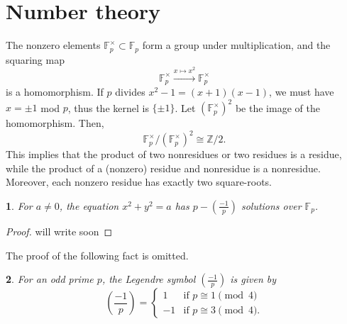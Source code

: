 \documentclass[10pt,a5paper]{amsart}
\numberwithin{equation}{section}
\numberwithin{figure}{section}
\theoremstyle{definition}
\theoremstyle{remark}
\theoremstyle{plain}
\theoremstyle{plain}
\theoremstyle{definition}
\theoremstyle{plain}
\newtheorem{prop}{\protect\propositionname}[section]
\theoremstyle{plain}
\providecommand{\propositionname}{Proposition}
\newcommand{\legendre}[2]{\genfrac{(}{)}{}{}{#1}{#2}}
\begin{document}
\section{Number theory}
The nonzero elements $\mathbb{F}^\times_p \subset \mathbb{F}_p$ form a group under multiplication, and the squaring map
\[
	\mathbb{F}^\times_p \xrightarrow{x \mapsto x^2} \mathbb{F}^\times_p
\]
is a homomorphism. If $p$ divides $x^2 - 1 = (x+1)(x-1)$, we must have $x = \pm 1$ mod $p$, thus the kernel is $\{\pm 1\}$. Let $(\mathbb{F}^\times_p)^2$ be the image of the homomorphism. Then,
\[
	\mathbb{F}^\times_p / (\mathbb{F}^\times_p)^2 \cong \mathbb{Z}/2.
\]
This implies that the product of two nonresidues or two residues is a residue, while the product of a (nonzero) residue and nonresidue is a nonresidue. Moreover, each nonzero residue has exactly two square-roots.
\begin{prop}\label{prop:circle-solutions}
	For $a \neq 0$, the equation $x^2 + y^2 = a$ has $p - \legendre{-1}{p}$ solutions over $\mathbb{F}_p$.
\end{prop}
\begin{proof}
	\color{blue}will write soon\color{black}
\end{proof}
The proof of the following fact is omitted.
\begin{prop}
	For an odd prime $p$, the Legendre symbol $\legendre{-1}{p}$ is given by
	\[
		\legendre{-1}{p} = \left\{
			\begin{matrix}
				1 & \text{if } p \cong 1 \pmod 4 \\
				-1 & \text{if } p \cong 3 \pmod 4.
			\end{matrix}
		\right.
	\]
\end{prop}
\end{document}
